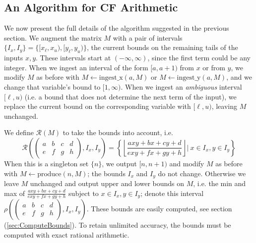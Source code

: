 \documentclass[11pt, oneside]{amsart}   	%
\newcommand{\bihom}[8]{{\frac{#1 xy + #2 x + #3 y + #4}{#5 xy + #6 x + #7 y + #8}}}
\newcommand{\abcd}{\left(
\begin{smallmatrix} 
a & b & c & d\\ 
e & f & g & h
\end{smallmatrix}
\right)}
\begin{document}
\subsection{An Algorithm for CF Arithmetic}\label{sec:finalAlgorithm}
We now present the full details of the algorithm suggested in the previous section.  We augment the matrix $M$ with a pair of intervals $\{I_x, I_y\} = \{[x_{\ell},x_{u}), [y_{\ell}, y_{u})\}$, the current bounds on the remaining tails of the inputs $x,y$. These intervals start at $(-\infty, \infty)$, since the first term could be any integer. When we ingest an interval of the form $[a,a+1)$ from $x$ or from $y$, we modify $M$ as before with $M \leftarrow \mbox{ingest\_x}(a,M)$ or $M \leftarrow \mbox{ingest\_y}(a,M)$, and we change that variable's bound to $[1, \infty)$. When we ingest an \emph{ambiguous} interval $[\ell, u)$ (i.e. a bound that does not determine the next term of the input), we replace the current bound on the corresponding variable with $[\ell, u)$, leaving $M$ unchanged. 

We define $\mathcal{R}(M)$ to take the bounds into account, i.e.
\begin{equation}
\mathcal{R}\left(\abcd, I_x, I_y\right) = \left\{ \left\lfloor \bihom{a}{b}{c}{d}{e}{f}{g}{h} \right\rfloor | \  x \in I_x, y \in I_y \right\}
\end{equation}
When this is a singleton set $\{n\}$, we output $[n,n+1)$ and modify $M$ as before with $M \leftarrow \mbox{produce}(n,M)$; the bounds $I_x$ and $I_y$ do not change. Otherwise we leave $M$ unchanged and output upper and lower bounds on $M$, i.e. the min and max of $\bihom{a}{b}{c}{d}{e}{f}{g}{h}$ subject to $x \in I_x, y \in I_y$; denote this interval $\rho\left(\abcd, I_x, I_y\right)$. These bounds are easily computed, see section (\ref{sec:ComputeBounds}). To retain unlimited accuracy, the bounds must be computed with exact rational arithmetic.
\end{document}
